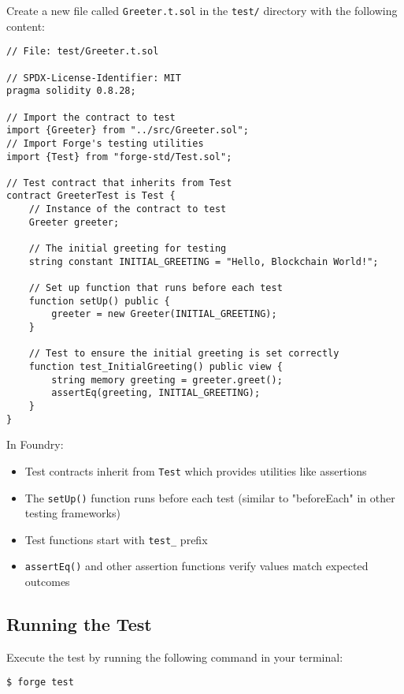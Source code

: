 \documentclass[12pt]{article}
\begin{document}
Create a new file called \texttt{Greeter.t.sol} in the \texttt{test/} directory with the following content:

\noindent
\begin{minipage}[c]{\textwidth}
\begin{lstlisting}[language=Solidity]
// File: test/Greeter.t.sol

// SPDX-License-Identifier: MIT
pragma solidity 0.8.28;

// Import the contract to test
import {Greeter} from "../src/Greeter.sol";
// Import Forge's testing utilities
import {Test} from "forge-std/Test.sol";

// Test contract that inherits from Test
contract GreeterTest is Test {
    // Instance of the contract to test
    Greeter greeter;
    
    // The initial greeting for testing
    string constant INITIAL_GREETING = "Hello, Blockchain World!";
    
    // Set up function that runs before each test
    function setUp() public {
        greeter = new Greeter(INITIAL_GREETING);
    }
    
    // Test to ensure the initial greeting is set correctly
    function test_InitialGreeting() public view {
        string memory greeting = greeter.greet();
        assertEq(greeting, INITIAL_GREETING);
    }
}
\end{lstlisting}
\end{minipage}

\noindent
In Foundry:
\begin{itemize}
    \item Test contracts inherit from \texttt{Test} which provides utilities like assertions
    \item The \texttt{setUp()} function runs before each test (similar to "beforeEach" in other testing frameworks)
    \item Test functions start with \texttt{test\_} prefix
    \item \texttt{assertEq()} and other assertion functions verify values match expected outcomes
\end{itemize}

\subsection{Running the Test}

Execute the test by running the following command in your terminal:

\begin{verbatim}
$ forge test
\end{verbatim}
\end{document}
